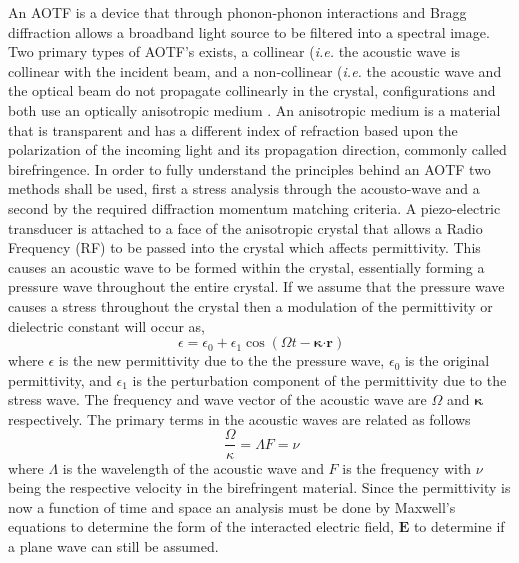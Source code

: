 An AOTF is a device that through phonon-phonon interactions and Bragg diffraction allows a broadband light source to be filtered into a spectral image. Two primary types of AOTF's exists, a collinear (\emph{i.e.} the acoustic wave is collinear with the incident beam, \citep{Harris1969} and a non-collinear (\emph{i.e.} the acoustic wave and the optical beam do not propagate collinearly in the crystal, \citep{Chang1977} configurations and both use an optically anisotropic medium \citep{Saito1976}. An anisotropic medium is a material that is transparent and has a different index of refraction based upon the polarization of the incoming light and its propagation direction, commonly called birefringence. In order to fully understand the principles behind an AOTF two methods shall be used, first a stress analysis through the acousto-wave and a second by the required diffraction momentum matching criteria. A piezo-electric transducer is attached to a face of the anisotropic crystal that allows a Radio Frequency (RF) to be passed into the crystal which affects permittivity. This causes an acoustic wave to be formed within the crystal, essentially forming a pressure wave throughout the entire crystal. If we assume that the pressure wave causes a stress throughout the crystal then a modulation of the permittivity or dielectric constant will occur as,
\begin{equation}
    \ \epsilon = \epsilon_{0} + \epsilon_{1}\cos(\Omega t - \boldsymbol\kappa \boldsymbol\cdot \mathbf{r})
    \label{eqn:3.1:dielectricMod}
\end{equation}
where $\epsilon$ is the new permittivity due to the the pressure wave, $\epsilon_{0}$ is the original permittivity, and $\epsilon_{1}$ is the perturbation component of the permittivity due to the stress wave. The frequency and wave vector of the acoustic wave are $\Omega$ and $\boldsymbol\kappa$ respectively. The primary terms in the acoustic waves are related as follows
\begin{equation}
    \ \frac{\Omega}{\kappa} = \Lambda F = \nu
    \label{eqn:3.1:acoustoWaveDef}
\end{equation}
where $\Lambda$ is the wavelength of the acoustic wave and $F$ is the frequency with $\nu$ being the respective velocity in the birefringent material. Since the permittivity is now a function of time and space an analysis must be done by Maxwell's equations to determine the form of the interacted electric field, $\mathbf{E}$ to determine if a plane wave can still be assumed.

